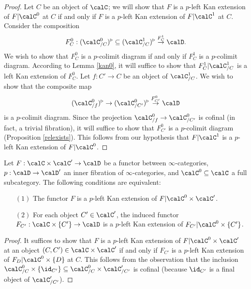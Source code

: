 \begin{proof}
Let $C$ be an object of $\calC$; we will show that $F$ is a $p$-left Kan extension of $F|\calC^{0}$ at $C$ if and only if $F$ is a $p$-left Kan extension of $F| \calC^{1}$ at $C$. Consider the composition
$$ F^0_{C}: (\calC^{0}_{/C})^{\triangleright} \subseteq
(\calC^{1}_{/C})^{\triangleright} \stackrel{F^1_{C}}{\rightarrow} \calD.$$
We wish to show that $F^0_{C}$ is a $p$-colimit diagram
if and only if $F^1_{C}$ is a $p$-colimit
diagram. According to Lemma \ref{kan0}, it will suffice to show that $F^1_{C} | \calC^{1}_{/C}$ is a left Kan extension of $F^0_{C}$. Let $f: C' \rightarrow C$ be an object of
$\calC^{1}_{/C}$. We wish to show that the composite map
$$ (\calC^{0}_{/f})^{\triangleright} \rightarrow (\calC^{0}_{/C'})^{\triangleright} \stackrel{F^{0}_{C'}}{\rightarrow} \calD$$ is a $p$-colimit diagram. Since the projection
$\calC^{0}_{/f} \rightarrow \calC^{0}_{/C'}$ is cofinal (in fact, a trivial fibration), it will suffice to show that $F^0_{C'}$ is a $p$-colimit diagram (Proposition \ref{relexists}). This follows from our hypothesis that $F| \calC^{1}$ is a $p$-left Kan extension of $F| \calC^{0}$.
\end{proof}

\begin{proposition}\label{stormus}
Let $F: \calC \times \calC' \rightarrow \calD$ be a functor between $\infty$-categories, $p:
\calD \rightarrow \calD'$ an inner fibration of $\infty$-categories, 
and $\calC^{0} \subseteq \calC$ a full subcategory. The following conditions are
equivalent:
\begin{itemize}
\item[$(1)$] The functor $F$ is a $p$-left Kan extension of $F| \calC^{0} \times \calC'$.
\item[$(2)$] For each object $C' \in \calC'$, the induced functor
$F_{C'}: \calC \times \{C'\} \rightarrow \calD$ is a $p$-left Kan extension of
$F_{C'}| \calC^{0} \times \{C'\}$.
\end{itemize}
\end{proposition}

\begin{proof}
It suffices to show that $F$ is a $p$-left Kan extension of $F|\calC^{0} \times \calC'$
at an object $(C,C') \in \calC \times \calC'$ if and only if $F_{C'}$ is a $p$-left Kan extension
of $F_{D} | \calC^{0} \times \{D\}$ at $C$. This follows from the observation that the inclusion
$\calC^{0}_{/C} \times \{ \id_{C'} \} \subseteq \calC^{0}_{/C} \times \calC'_{/C'}$ is cofinal
(because $\id_{C'}$ is a final object of $\calC'_{/C'}$). 
\end{proof}

